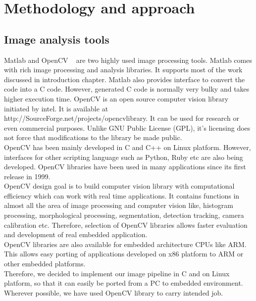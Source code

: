 
\chapter{Methodology and approach} %
\label{Chapter2}

\section{Image analysis tools}

\indent Matlab and OpenCV ~\cite{34} are two highly used image
processing tools.  Matlab comes with rich image processing and analysis
libraries. It supports most of the work discussed in introduction
chapter. Matlab also provides interface to convert the code into a C
code. However, generated C code is normally very bulky and takes higher
execution time. OpenCV is an open source computer vision library
initiated by intel. It is available at
http://SourceForge.net/projects/opencvlibrary. It can be used for
research or even commercial purposes. Unlike GNU Public License (GPL),
it's licensing does not force that modifications to the library be made
public. \\

\indent OpenCV has been mainly developed in C and C++ on Linux platform.
However, interfaces for other scripting language such as Python, Ruby
etc are also being developed. OpenCV libraries have been used in many
applications since its first release in 1999.\\

\indent OpenCV design goal is to build computer vision library with
computational efficiency which can work with real time applications. It
contains functions in almost all the area of image processing  and
computer vision like, histogram processing, morphological processing,
segmentation, detection tracking, camera calibration etc. Therefore,
selection of OpenCV libraries allows faster evaluation and development
of real embedded application.\\

\indent OpenCV libraries are also available for embedded architecture
CPUs like ARM. This allows easy porting of applications developed on x86
platform to ARM or other embedded platforms.\\

\indent Therefore, we decided to implement our image pipeline in C and
on Linux platform, so that it can easily be ported from a PC to embedded
environment. Wherever possible, we have used OpenCV library to carry
intended job.

